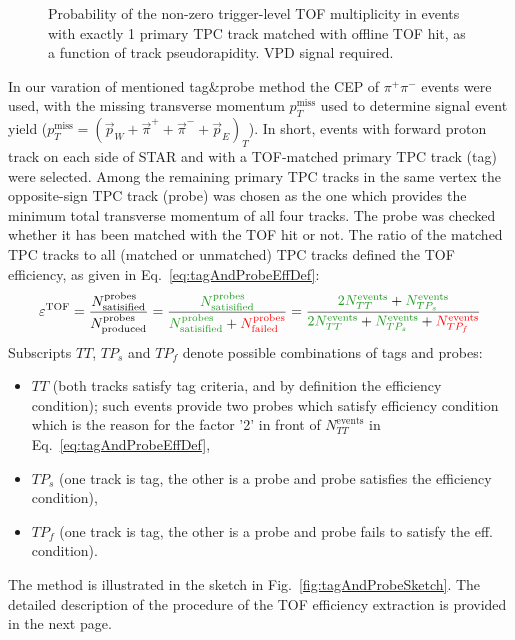 \begin{figure}[b!]
\begin{minipage}{.4725\textwidth}
  \caption[Probability of the non-zero TOF L0 multiplicity if 1 primary TOF-matched TPC track vs. track $\eta$.]
   {Probability of the non-zero trigger-level TOF multiplicity in events with exactly 1 primary TPC track matched with offline TOF hit, as a function of track pseudorapidity. VPD signal required.}
   \label{fig:tofTrigEffTagAndProbe}%
\end{minipage}%
\end{figure}%

In our varation of mentioned tag\&probe method the CEP of $\pi^{+}\pi^{-}$ events were used, with the missing transverse momentum $p_{T}^{\text{miss}}$ used to determine signal event yield ($p_{T}^{\text{miss}}=(\vec{p}_{W}+\vec{\pi}^{+}+\vec{\pi}^{-}+\vec{p}_{E})_{T}$). In short, events with forward proton track on each side of STAR and with a TOF-matched primary TPC track (tag) were selected. Among the remaining primary TPC tracks in the same vertex the opposite-sign TPC track (probe) was chosen as the one which provides the minimum total transverse momentum of all four tracks. The probe was checked whether it has been matched with the TOF hit or not. The ratio of the matched TPC tracks to all (matched or unmatched) TPC tracks defined the TOF efficiency, as given in Eq.~\eqref{eq:tagAndProbeEffDef}:%
\begin{equation}\label{eq:tagAndProbeEffDef}%
\varepsilon^{\text{TOF}}=\frac{N^{\text{probes}}_{\text{satisified}}}{N^{\text{probes}}_{\text{produced}}} = \frac{\textcolor{dgreen}{N^{\text{probes}}_{\text{satisified}}}}{\textcolor{dgreen}{N^{\text{probes}}_{\text{satisified}}}+\textcolor{red}{N^{\text{probes}}_{\text{failed}}}} = \frac{\textcolor{dgreen}{2 N^{\text{events}}_{TT}} + \textcolor{dgreen}{N^{\text{events}}_{TP_{s}}}}{\textcolor{dgreen}{2 N^{\text{events}}_{TT}} + \textcolor{dgreen}{N^{\text{events}}_{TP_{s}}} + \textcolor{red}{N^{\text{events}}_{TP_{f}}}}
\end{equation}%
Subscripts $TT$, $TP_{s}$ and $TP_{f}$ denote possible combinations of tags and probes:\\[-17pt]
\begin{itemize}%
 \item $TT$ (both tracks satisfy tag criteria, and by definition the efficiency condition); such events provide two probes which satisfy efficiency condition which is the reason for the factor '2' in front of $N^{\text{events}}_{TT}$ in Eq.~\eqref{eq:tagAndProbeEffDef},\\[-17pt]
 \item $TP_{s}$ (one track is tag, the other is a probe and probe satisfies the efficiency condition),\\[-17pt]
 \item $TP_{f}$ (one track is tag, the other is a probe and probe fails to satisfy the eff. condition).%
\end{itemize}%
The method is illustrated in the sketch in Fig.~\ref{fig:tagAndProbeSketch}. The detailed description of the procedure of the TOF efficiency extraction is provided in the next page.\newpage

